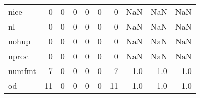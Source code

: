 \begin{longtable}{lrrrrrrrrr}
nice      &                                       0 &                                                  0 &                                                  0 &                                                  0 &                                                  0 &                                                  0 &                                                NaN &                                    NaN &                                  NaN \\
nl        &                                       0 &                                                  0 &                                                  0 &                                                  0 &                                                  0 &                                                  0 &                                                NaN &                                    NaN &                                  NaN \\
nohup     &                                       0 &                                                  0 &                                                  0 &                                                  0 &                                                  0 &                                                  0 &                                                NaN &                                    NaN &                                  NaN \\
nproc     &                                       0 &                                                  0 &                                                  0 &                                                  0 &                                                  0 &                                                  0 &                                                NaN &                                    NaN &                                  NaN \\
numfmt    &                                       7 &                                                  0 &                                                  0 &                                                  0 &                                                  0 &                                                  7 &                                                1.0 &                                    1.0 &                                  1.0 \\
od        &                                      11 &                                                  0 &                                                  0 &                                                  0 &                                                  0 &                                                 11 &                                                1.0 &                                    1.0 &                                  1.0 \\

\end{longtable}
